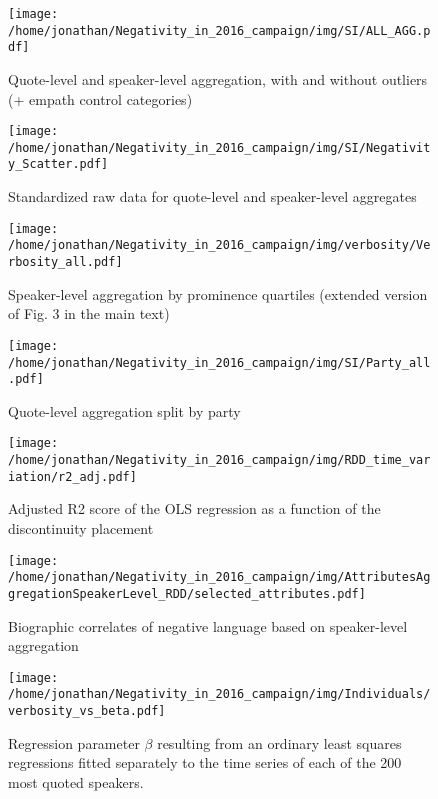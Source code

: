 \begin{figure}[h]\centering
	\texttt{[image: /home/jonathan/Negativity\_in\_2016\_campaign/img/SI/ALL\_AGG.pdf]}
	\caption{Quote-level and speaker-level aggregation, with and without outliers (+ empath control categories)}
	\label{fig: SI_1}
\end{figure}



\begin{figure}[h]\centering
	\texttt{[image: /home/jonathan/Negativity\_in\_2016\_campaign/img/SI/Negativity\_Scatter.pdf]}
	\caption{Standardized raw data for quote-level and speaker-level aggregates}
	\label{fig: SI_2}
\end{figure}



\begin{figure}[h]\centering
	\texttt{[image: /home/jonathan/Negativity\_in\_2016\_campaign/img/verbosity/Verbosity\_all.pdf]}
	\caption{Speaker-level aggregation by prominence quartiles (extended version of Fig. 3 in the main text)}
	\label{fig: SI_3}
\end{figure}



\begin{figure}[h]\centering
	\texttt{[image: /home/jonathan/Negativity\_in\_2016\_campaign/img/SI/Party\_all.pdf]}
	\caption{Quote-level aggregation split by party}
	\label{fig: SI_4}
\end{figure}



\begin{figure}[h]\centering
	\texttt{[image: /home/jonathan/Negativity\_in\_2016\_campaign/img/RDD\_time\_variation/r2\_adj.pdf]}
	\caption{Adjusted R2 score of the OLS regression as a function of the discontinuity placement}
	\label{fig: SI_5}
\end{figure}



\begin{figure}[h]\centering
	\texttt{[image: /home/jonathan/Negativity\_in\_2016\_campaign/img/AttributesAggregationSpeakerLevel\_RDD/selected\_attributes.pdf]}
	\caption{Biographic correlates of negative language based on speaker-level aggregation}
	\label{fig: SI_6}
\end{figure}



\begin{figure}[h]\centering
	\texttt{[image: /home/jonathan/Negativity\_in\_2016\_campaign/img/Individuals/verbosity\_vs\_beta.pdf]}
	\caption{Regression parameter $\beta$ resulting from an ordinary least squares regressions fitted separately to the time series of each of the 200 most quoted speakers.}
	\label{fig: SI_7}
\end{figure}




